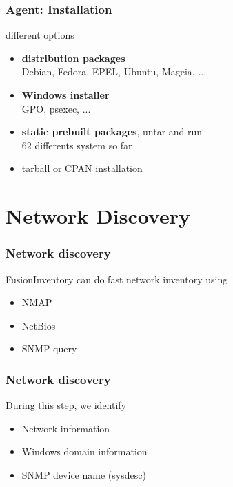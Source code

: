 \documentclass{beamer}
\begin{document}
\begin{frame}
    \frametitle{Agent: Installation}


    \begin{block}{different options}
        \begin{itemize}
            \item \textbf{distribution packages} \\
            \small{Debian, Fedora, EPEL, Ubuntu, Mageia, ...}
            \item \textbf{Windows installer} \\
            \small{GPO, psexec, ...}
            \item \textbf{static prebuilt packages}, untar and run \\
            \small{62 differents system so far}
            \item tarball or CPAN installation
        \end{itemize}
    \end{block}
\end{frame}




\section{Network Discovery}

\begin{frame}
    \frametitle{Network discovery}

    \begin{block}{FusionInventory can do fast network inventory using}
    \begin{itemize}
      \item NMAP 
      \item NetBios
      \item SNMP query
    \end{itemize}
    \end{block}

\end{frame}

\begin{frame}
    \frametitle{Network discovery}

    \begin{block}{During this step, we identify}
    \begin{itemize}
        \item Network information
        \item Windows domain information
        \item SNMP device name (sysdesc)
    \end{itemize}
    \end{block}
\end{frame}
\end{document}
